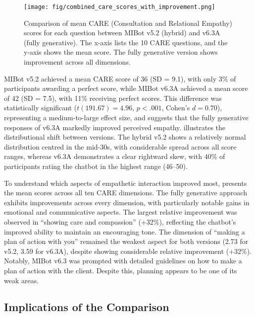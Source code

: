 \begin{figure}[htbp]
	\centering
	\texttt{[image: fig/combined\_care\_scores\_with\_improvement.png]}
	\caption[Comparison of Mean CARE Scores per Question]{Comparison of mean CARE (Consultation and Relational Empathy) scores for each question between MIBot v5.2 (hybrid) and v6.3A (fully generative). The x-axis lists the 10 CARE questions, and the y-axis shows the mean score. The fully generative version shows improvement across all dimensions.}
	\label{fig:care_questions}
\end{figure}

MIBot v5.2 achieved a mean CARE score of 36 (SD = 9.1), with only 3\% of participants awarding a perfect score, while MIBot v6.3A achieved a mean score of 42 (SD = 7.5), with 11\% receiving perfect scores. This difference was statistically significant ($t(191.67) = 4.96$, $p < .001$, Cohen's $d = 0.70$), representing a medium-to-large effect size, and suggests that the fully generative responses of v6.3A markedly improved perceived empathy.  illustrates the distributional shift between versions. The hybrid v5.2 shows a relatively normal distribution centred in the mid-30s, with considerable spread across all score ranges, whereas v6.3A demonstrates a clear rightward skew, with 40\% of participants rating the chatbot in the highest range (46--50).

To understand which aspects of empathetic interaction improved most,  presents the mean scores across all ten CARE dimensions. The fully generative approach exhibits improvements across every dimension, with particularly notable gains in emotional and communicative aspects. The largest relative improvement was observed in ``showing care and compassion'' (+32\%), reflecting the chatbot's improved ability to maintain an encouraging tone. The dimension of ``making a plan of action with you'' remained the weakest aspect for both versions (2.73 for v5.2, 3.59 for v6.3A), despite showing considerable relative improvement (+32\%). Notably, MIBot v6.3 was prompted with detailed guidelines on how to make a plan of action with the client. Despite this, planning appears to be one of its weak areas.



\subsection*{Implications of the Comparison}

